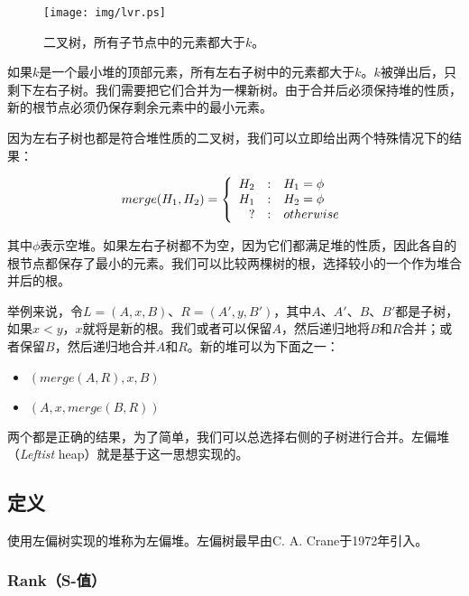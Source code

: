 \documentclass[UTF8]{article}
\begin{document}
\begin{figure}[htbp]
    \centering
    \texttt{[image: img/lvr.ps]}
    \caption{二叉树，所有子节点中的元素都大于$k$。} \label{fig:lvr}
\end{figure}

如果$k$是一个最小堆的顶部元素，所有左右子树中的元素都大于$k$。$k$被弹出后，只剩下左右子树。我们需要把它们合并为一棵新树。由于合并后必须保持堆的性质，新的根节点必须仍保存剩余元素中的最小元素。

因为左右子树也都是符合堆性质的二叉树，我们可以立即给出两个特殊情况下的结果：

\[
merge(H_1, H_2) = \left \{
  \begin{array}
  {r@{\quad:\quad}l}
  H_2 & H_1 = \phi \\
  H_1 & H_2 = \phi \\
  ? & otherwise
  \end{array}
\right.
\]

其中$\phi$表示空堆。如果左右子树都不为空，因为它们都满足堆的性质，因此各自的根节点都保存了最小的元素。我们可以比较两棵树的根，选择较小的一个作为堆合并后的根。

举例来说，令$L = (A, x, B)$、$R = (A', y, B')$，其中$A$、$A'$、$B$、$B'$都是子树，如果$x < y$，$x$就将是新的根。我们或者可以保留$A$，然后递归地将$B$和$R$合并；或者保留$B$，然后递归地合并$A$和$R$。新的堆可以为下面之一：

\begin{itemize}
\item $(merge(A, R), x, B)$
\item $(A, x, merge(B, R))$
\end{itemize}

两个都是正确的结果，为了简单，我们可以总选择右侧的子树进行合并。左偏堆（{\em Leftist} heap）就是基于这一思想实现的。

\subsection{定义}

使用左偏树实现的堆称为左偏堆。左偏树最早由C. A. Crane于1972年引入\cite{wiki-leftist-tree}。

\subsubsection{Rank（S-值）}
\end{document}
